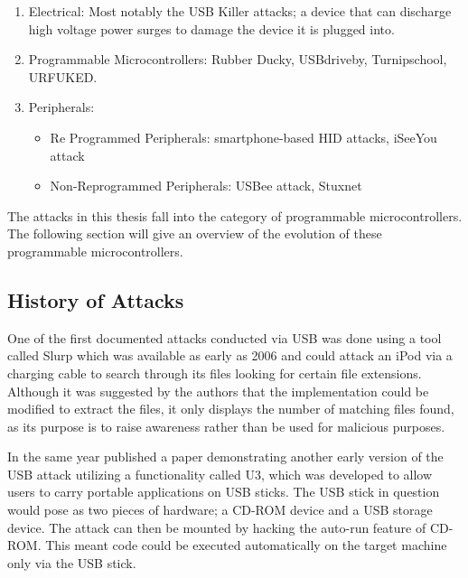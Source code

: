 \begin{enumerate}
  \item Electrical: Most notably the USB Killer attacks; a device that can discharge high voltage power surges to damage the device it is plugged into. \cite{USBKillDevices}
  \item Programmable Microcontrollers: Rubber Ducky, USBdriveby, Turnipschool, URFUKED.
  \item Peripherals:
  \begin{itemize}
      \item Re Programmed Peripherals: smartphone-based HID attacks, iSeeYou attack
      \item Non-Reprogrammed Peripherals: USBee attack, Stuxnet
  \end{itemize}
\end{enumerate}
	

The attacks in this thesis fall into the category of programmable microcontrollers. The following section will give an overview of the evolution of these programmable microcontrollers.

\subsection{History of Attacks} \label{HistoryOfAttacks}

One of the first documented attacks conducted via USB was done using a tool called Slurp \cite{SharpIdeasDownloads2006} which was available as early as 2006 and could attack an iPod via a charging cable to search through its files looking for certain file extensions. Although it was suggested by the authors that the implementation could be modified to extract the files, it only displays the number of matching files found, as its purpose is to raise awareness rather than be used for malicious purposes.

In the same year \cite{al-zarouniRealityRisksConsented2006} published a paper demonstrating another early version of the USB attack utilizing a functionality called U3, which was developed to allow users to carry portable applications on USB sticks. The USB stick in question would pose as two pieces of hardware; a CD-ROM device and a USB storage device. The attack can then be mounted by hacking the auto-run feature of CD-ROM. This meant code could be executed automatically on the target machine only via the USB stick. 

